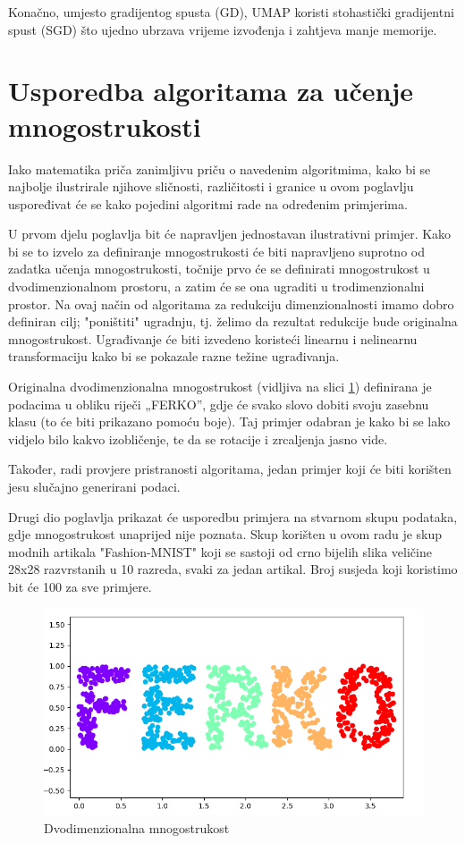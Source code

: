 \documentclass[times, utf8, diplomski]{fer}
\begin{document}
Konačno, umjesto gradijentog spusta (GD), UMAP koristi stohastički gradijentni spust (SGD) što ujedno ubrzava vrijeme izvođenja i zahtjeva manje memorije.

\section{Usporedba algoritama za učenje mnogostrukosti}

Iako matematika priča zanimljivu priču o navedenim algoritmima, kako bi se najbolje ilustrirale njihove sličnosti, različitosti i granice u ovom poglavlju uspoređivat će se kako pojedini algoritmi rade na određenim primjerima.

U prvom djelu poglavlja bit će napravljen jednostavan ilustrativni primjer. Kako bi se to izvelo za definiranje mnogostrukosti će biti napravljeno suprotno od zadatka učenja mnogostrukosti, točnije prvo će se definirati mnogostrukost u dvodimenzionalnom prostoru, a zatim će se ona ugraditi u trodimenzionalni prostor. Na ovaj način od algoritama za redukciju dimenzionalnosti imamo dobro definiran cilj; "poništiti" ugradnju, tj. želimo da rezultat redukcije bude originalna mnogostrukost. Ugrađivanje će biti izvedeno koristeći linearnu i nelinearnu transformaciju kako bi se pokazale razne težine ugrađivanja.

Originalna dvodimenzionalna mnogostrukost (vidljiva na slici \ref{fig:ferko}) definirana je podacima u obliku riječi „FERKO”, gdje će svako slovo dobiti svoju zasebnu klasu (to će biti prikazano pomoću boje). Taj primjer odabran je kako bi se lako vidjelo bilo kakvo izobličenje, te da se rotacije i zrcaljenja jasno vide.

Također, radi provjere pristranosti algoritama, jedan primjer koji će biti korišten jesu slučajno generirani podaci.

Drugi dio poglavlja prikazat će usporedbu primjera na stvarnom skupu podataka, gdje mnogostrukost unaprijed nije poznata. Skup korišten u ovom radu je skup modnih artikala "Fashion-MNIST" koji se sastoji od crno bijelih slika veličine 28x28 razvrstanih u 10 razreda, svaki za jedan artikal. Broj susjeda koji koristimo bit će 100 za sve primjere.

\begin{figure}[htb]
    \centering
    \includegraphics[width=12cm]{resources/images/reduction/compare/ferko.png}
    \caption{Dvodimenzionalna mnogostrukost}
    \label{fig:ferko}
\end{figure}
\end{document}
